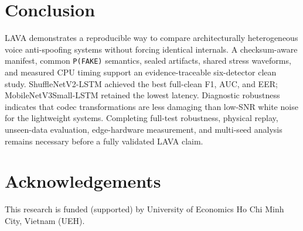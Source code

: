 \documentclass[10pt,journal,onecolumn]{IEEEtran}
\begin{document}
\section{Conclusion}
LAVA demonstrates a reproducible way to compare architecturally heterogeneous voice anti-spoofing systems without forcing identical internals. A checksum-aware manifest, common \texttt{P(FAKE)} semantics, sealed artifacts, shared stress waveforms, and measured CPU timing support an evidence-traceable six-detector clean study. ShuffleNetV2-LSTM achieved the best full-clean F1, AUC, and EER; MobileNetV3Small-LSTM retained the lowest latency. Diagnostic robustness indicates that codec transformations are less damaging than low-SNR white noise for the lightweight systems. Completing full-test robustness, physical replay, unseen-data evaluation, edge-hardware measurement, and multi-seed analysis remains necessary before a fully validated LAVA claim.

\section{Acknowledgements}
This research is funded (supported) by University of Economics Ho Chi Minh City, Vietnam (UEH).



\end{document}
